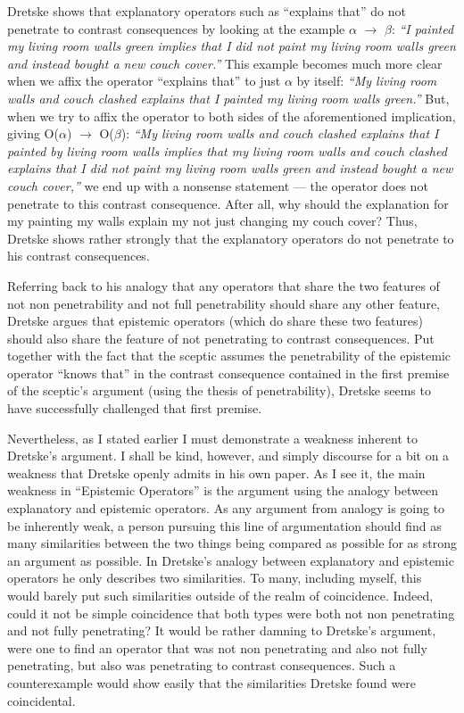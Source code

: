 \documentclass[12pt,letterpaper]{report}
\begin{document}
Dretske shows that explanatory operators such as ``explains that'' do not penetrate to contrast consequences by looking at the example $\alpha$ $\rightarrow$ $\beta$: \textit{``I painted my living room walls green implies that I did not paint my living room walls green and instead bought a new couch cover.''} This example becomes much more clear when we affix the operator ``explains that'' to just $\alpha$ by itself: \textit{``My living room walls and couch clashed explains that I painted my living room walls green.''} But, when we try to affix the operator to both sides of the aforementioned implication, giving O($\alpha$) $\rightarrow$ O($\beta$): \textit{``My living room walls and couch clashed explains that I painted by living room walls implies that my living room walls and couch clashed explains that I did not paint my living room walls green and instead bought a new couch cover,''} we end up with a nonsense statement --- the operator does not penetrate to this contrast consequence. After all, why should the explanation for my painting my walls explain my not just changing my couch cover? Thus, Dretske shows rather strongly that the explanatory operators do not penetrate to his contrast consequences. 

Referring back to his analogy that any operators that share the two features of not non penetrability and not full penetrability should share any other feature, Dretske argues that epistemic operators (which do share these two features) should also share the feature of not penetrating to contrast consequences. Put together with the fact that the sceptic assumes the penetrability of the epistemic operator ``knows that'' in the contrast consequence contained in the first premise of the sceptic's argument (using the thesis of penetrability), Dretske seems to have successfully challenged that first premise.

Nevertheless, as I stated earlier I must demonstrate a weakness inherent to Dretske's argument. I shall be kind, however, and simply discourse for a bit on a weakness that Dretske openly admits in his own paper. As I see it, the main weakness in ``Epistemic Operators'' is the argument using the analogy between explanatory and epistemic operators. As any argument from analogy is going to be inherently weak, a person pursuing this line of argumentation should find as many similarities between the two things being compared as possible for as strong an argument as possible. In Dretske's analogy between explanatory and epistemic operators he only describes two similarities. To many, including myself, this would barely put such similarities outside of the realm of coincidence. Indeed, could it not be simple coincidence that both types were both not non penetrating and not fully penetrating? It would be rather damning to Dretske's argument, were one to find an operator that was not non penetrating and also not fully penetrating, but also was penetrating to contrast consequences. Such a counterexample would show easily that the similarities Dretske found were coincidental.
\end{document}
